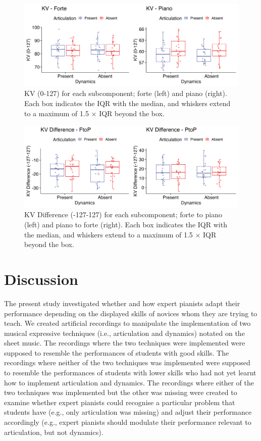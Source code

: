 \documentclass[
  man,floatsintext]{apa6}
\begin{document}
\begin{figure}
\includegraphics[width=1\linewidth]{manuscript_files/figure-latex/plot-vel-1-1} \caption{\label{fig:vel-1}KV (0-127) for each subcomponent; forte (left) and piano (right). Each box indicates the IQR with the median, and whiskers extend to a maximum of 1.5 × IQR beyond the box.}\label{fig:plot-vel-1}
\end{figure}

\begin{figure}
\includegraphics[width=1\linewidth]{manuscript_files/figure-latex/plot-vel-diff-1-1} \caption{\label{fig:vel-diff-1}KV Difference (-127-127) for each subcomponent; forte to piano (left) and piano to forte (right). Each box indicates the IQR with the median, and whiskers extend to a maximum of 1.5 × IQR beyond the box.}\label{fig:plot-vel-diff-1}
\end{figure}

\clearpage

\hypertarget{discussion}{%
\section{Discussion}\label{discussion}}

The present study investigated whether and how expert pianists adapt their performance depending on the displayed skills of novices whom they are trying to teach. We created artificial recordings to manipulate the implementation of two musical expressive techniques (i.e., articulation and dynamics) notated on the sheet music. The recordings where the two techniques were implemented were supposed to resemble the performances of students with good skills. The recordings where neither of the two techniques was implemented were supposed to resemble the performances of students with lower skills who had not yet learnt how to implement articulation and dynamics. The recordings where either of the two techniques was implemented but the other was missing were created to examine whether expert pianists could recognise a particular problem that students have (e.g., only articulation was missing) and adjust their performance accordingly (e.g., expert pianists should modulate their performance relevant to articulation, but not dynamics).
\end{document}
